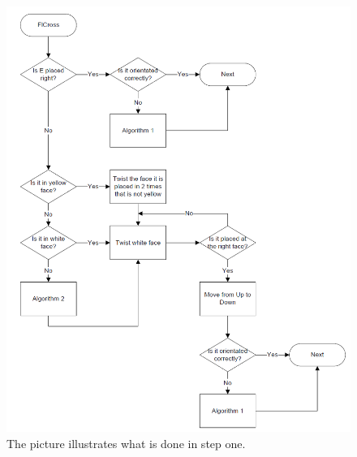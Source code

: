 \begin{figure}[htbp]
	\centering
		\includegraphics[scale=0.4]{input/pics/FlCrossFlow3.png}
	\caption{The picture illustrates what is done in step one.}
	\label{fig:FlCrossFlow}
\end{figure}
